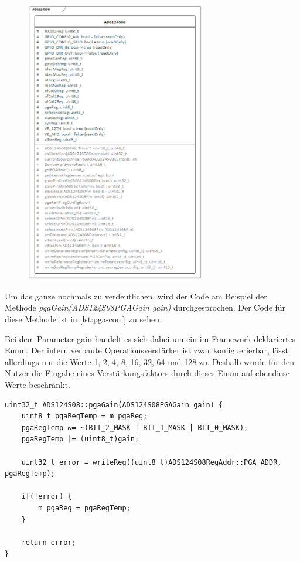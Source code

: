 \begin{figure}[!htb]
    \begin{center}
        \includegraphics[width=0.7\textwidth]{Figures/Chapter_3/ADS124S08.png}
        
        \label{fig:ads124s08-classdiagramm}
    \end {center}
\end{figure}

Um das ganze nochmals zu verdeutlichen, wird der Code am Beispiel der Methode \textit{pgaGain(ADS124S08PGAGain gain)} durchgesprochen.
Der Code für diese Methode ist in \autoref{lst:pga-conf} zu sehen.

Bei dem Parameter gain handelt es sich dabei um ein im Framework deklariertes Enum.
Der intern verbaute Operationsverstärker ist zwar konfiguerierbar, lässt allerdings nur die Werte 1, 2, 4, 8, 16, 32, 64 und 128 zu.
Deshalb wurde für den Nutzer die Eingabe eines Verstärkungsfaktors durch dieses Enum auf ebendiese Werte beschränkt.

\begin{lstlisting}[caption={Neukonfigurieren des intern verbauten Operationsverstärkers}, label=lst:pga-conf]
uint32_t ADS124S08::pgaGain(ADS124S08PGAGain gain) {
	uint8_t pgaRegTemp = m_pgaReg;
	pgaRegTemp &= ~(BIT_2_MASK | BIT_1_MASK | BIT_0_MASK);
	pgaRegTemp |= (uint8_t)gain;

	uint32_t error = writeReg((uint8_t)ADS124S08RegAddr::PGA_ADDR, pgaRegTemp);

	if(!error) {
		m_pgaReg = pgaRegTemp;
	}

	return error;
}
\end{lstlisting}

